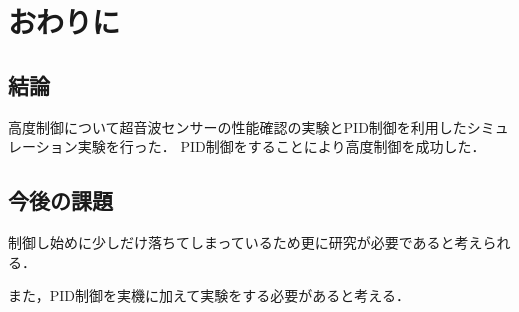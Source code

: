 \chapter{おわりに}
\section{結論}
高度制御について超音波センサーの性能確認の実験とPID制御を利用したシミュレーション実験を行った．
PID制御をすることにより高度制御を成功した．


\section{今後の課題}
制御し始めに少しだけ落ちてしまっているため更に研究が必要であると考えられる．


また，PID制御を実機に加えて実験をする必要があると考える．
